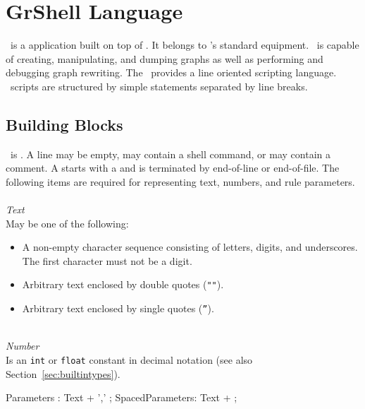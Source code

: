 \chapter{GrShell Language}
\label{chapgrshell}
\GrShell\ is a  application built on top of \LibGr{}. 
It belongs to \GrG's standard equipment. 
\GrShell\ is capable of creating, manipulating, and dumping graphs as well as performing and debugging graph rewriting.
The \GrShell\ provides a line oriented scripting language. 
\GrShell\ scripts are structured by simple statements separated by line breaks.


\section{Building Blocks}

\GrShell\ is . 
A line may be empty, may contain a shell command, or may contain a comment. 
A  starts with a \indexed{\texttt{\#}} and is terminated by end-of-line or end-of-file. 
The following items are required for representing text, numbers, and rule parameters.\\
\\
\emph{Text}\\
May be one of the following:
\begin{itemize}
  \item A non-empty character sequence consisting of letters, digits, and underscores. The first character must not be a digit.
  \item Arbitrary text enclosed by double quotes (\texttt{""}).
  \item Arbitrary text enclosed by single quotes (\texttt{''}).
\end{itemize}
\mbox{ }\\
\emph{Number}\\
Is an \texttt{int} or \texttt{float} constant in decimal notation (see also Section~\ref{sec:builtintypes}).

\begin{rail} 
 Parameters : Text + ',' ;
 SpacedParameters: Text + ; 
\end{rail}

